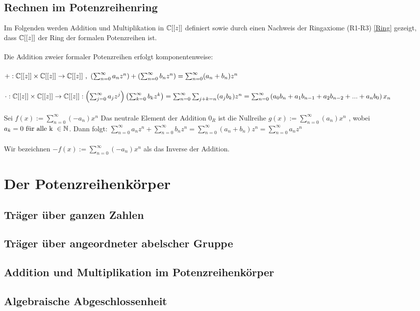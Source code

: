\subsection{Rechnen im Potenzreihenring} \label{Rechnen}
Im Folgenden werden Addition und Multiplikation in $\mathbb{C}[[z]]$ definiert sowie durch einen Nachweis der Ringaxiome (R1-R3) \ref{Ring} gezeigt, dass $\mathbb{C}[[z]]$ der Ring der formalen Potenzreihen ist. \\ \\
Die Addition zweier formaler Potenzreihen erfolgt komponentenweise: \\ \\
%
$+: \mathbb{C} [[z]] \times \mathbb{C} [[z]] \to \mathbb{C}[[z]] \text{ , } \left( \sum_{n=0}^\infty a_n z^n \right) + \left( \sum_{n=0}^\infty b_n z^n \right) = \sum_{n=0}^{\infty} (a_n + b_n) z^n $ \\ \\
%
$\cdot:  \mathbb{C} [[z]] \times \mathbb{C} [[z]] \to \mathbb{C}[[z]]: \left( \sum_{j=0}^\infty a_j z^j \right) \left( \sum_{k=0}^\infty b_k z^k \right)= \sum_{n=0}^\infty\sum_{j+k=n} (a_j b_k) z^n \\= \sum_{n= 0}^\infty \left(a_0b_n + a_1b_{n-1} + a_2b_{n-2} + ... + a_nb_0 \right)x_n$
%
\\ \\ Sei $ f(x) := \sum_{n=0}^\infty  (-a_n)x^n$
Das neutrale Element der Addition $0_R$ ist die Nullreihe  $ g(x) := \sum_{n=0}^\infty  (a_n)x^n$ , wobei $a_k= 0 \text{ für alle k } \in \mathbb{N} $. Dann folgt: $ \sum_{n=0}^\infty a_nz^n + \sum_{n=0}^\infty b_nz^n = \sum_{n=0}^\infty \left(a_n+b_n\right)z^n = \sum_{n=0}^\infty a_nz^n $ 
\\ \\
Wir bezeichnen $ -f(x) := \sum_{n=0}^\infty  (-a_n)x^n$ als das Inverse der Addition.
\section{Der Potenzreihenkörper}
%
\subsection{Träger über ganzen Zahlen}
\subsection{Träger über angeordneter abelscher Gruppe}
\subsection{Addition und Multiplikation im Potenzreihenkörper}
\subsection{Algebraische Abgeschlossenheit} %
%